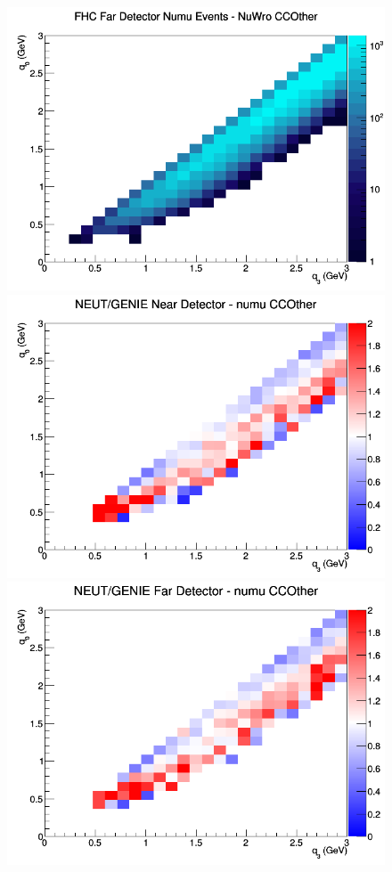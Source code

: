 \begin{figure}[h]
\endminipage
{}
\includegraphics[width=\linewidth]{q0_q3/nominal/CCOther_FHC_FD_numu_q3_q0_NuWro.png}
\endminipage
\newline
{}
\includegraphics[width=\linewidth]{q0_q3/nominal/ratios/CCOther_NEUT_GENIE_numu_near_q3_q0.png}
\endminipage
{}
\includegraphics[width=\linewidth]{q0_q3/nominal/ratios/CCOther_NEUT_GENIE_numu_far_q3_q0.png}

\end{figure}
